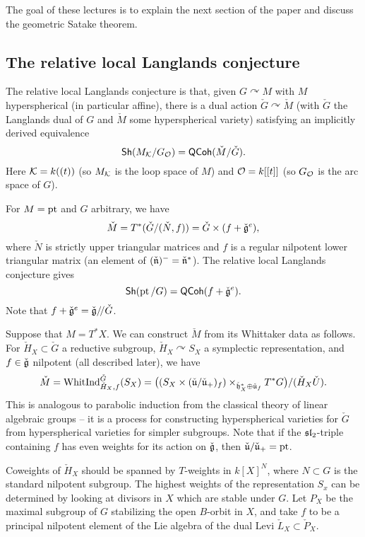 \documentclass{article}
\begin{document}
The goal of these lectures is to explain the next section of the paper and discuss the geometric Satake theorem.

\subsection{The relative local Langlands conjecture}

The relative local Langlands conjecture is that, given $G \curvearrowright M$ with $M$ hyperspherical (in particular affine), there is a dual action $\check{G} \curvearrowright \check{M}$ (with $\check{G}$ the Langlands dual of $G$ and $\check{M}$ some hyperspherical variety) satisfying an implicitly derived equivalence
\[
	\mathsf{Sh}(M_{\mathcal{K}} / G_{\mathcal{O}}) = \mathsf{QCoh}(\check{M} / \check{G}).
\]
Here $\mathcal{K} = k((t))$ (so $M_{\mathcal{K}}$ is the loop space of $M$) and $\mathcal{O} = k[[t]]$ (so $G_{\mathcal{O}}$ is the arc space of $G$).

\begin{ex}
	For $M = \operatorname{pt}$ and $G$ arbitrary, we have 
	\[
		\check{M} = T^*(\check{G} / (\check{N}, f)) = \check{G} \times (f + \check{\mathfrak{g}}^e),
	\]
	where $\check{N}$ is strictly upper triangular matrices and $f$ is a regular nilpotent lower triangular matrix (an element of $(\check{\mathfrak{n}})^- = \check{\mathfrak{n}}^*$).
	The relative local Langlands conjecture gives
	\[
		\mathsf{Sh}(\operatorname{pt} / G) = \mathsf{QCoh}(f + \check{\mathfrak{g}}^e).
	\]
	Note that $f + \check{\mathfrak{g}}^e = \check{\mathfrak{g}} /\mkern-3mu/ \check{G}$.
\end{ex}

Suppose that $M = T^*X$.
We can construct $\check{M}$ from its Whittaker data as follows.
For $\check{H}_X \subset \check{G}$ a reductive subgroup, $\check{H}_X \curvearrowright S_X$ a symplectic representation, and $f \in \check{\mathfrak{g}}$ nilpotent (all described later), we have
\[
	\check{M} = \operatorname{WhitInd}_{\check{H}_X,f}^{\check{G}}(S_X) = \big((S_X \times (\check{\mathfrak{u}} / \check{\mathfrak{u}}_+)_f) \times_{\check{\mathfrak{h}}_X^* \oplus \check{\mathfrak{u}}_f} T^* G\big) / (\check{H}_X \check{U}).
\]
This is analogous to parabolic induction from the classical theory of linear algebraic groups -- it is a process for constructing hyperspherical varieties for $\check{G}$ from hyperspherical varieties for simpler subgroups.
Note that if the $\mathfrak{sl}_2$-triple containing $f$ has even weights for its action on $\check{\mathfrak{g}}$, then $\check{\mathfrak{u}} / \check{\mathfrak{u}}_+ = \operatorname{pt}$.

Coweights of $\check{H}_X$ should be spanned by $T$-weights in $k[X]^N$, where $N \subset G$ is the standard nilpotent subgroup.
The highest weights of the representation $S_x$ can be determined by looking at divisors in $X$ which are stable under $G$.
Let $P_X$ be the maximal subgroup of $G$ stabilizing the open $B$-orbit in $X$, and take $f$ to be a principal nilpotent element of the Lie algebra of the dual Levi $\check{L}_X \subset \check{P}_X$.
\end{document}

